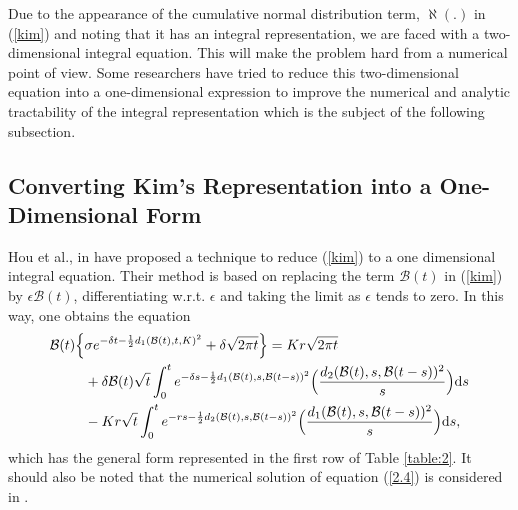 \documentclass[fleqn,final,3p,11pt]{elsarticle}
\theoremstyle{definition}
\theoremstyle{remark}
\numberwithin{equation}{section}
\begin{document}
Due to the appearance of the cumulative normal distribution term, $\aleph(.)$ in (\ref{kim}) and noting that it has an integral representation, we are faced with a two-dimensional integral equation. This will make the problem hard from a numerical point of view. Some researchers have tried to reduce this two-dimensional equation into a one-dimensional expression to improve the numerical and analytic tractability of the  integral representation which is the subject of the following subsection.
\subsection{Converting  Kim's Representation into a One-Dimensional Form}
Hou et al., in \cite{little} have proposed a technique to reduce (\ref{kim}) to a one dimensional integral equation. Their method is based on
 replacing the term $\mathcal{B}(t)$ in (\ref{kim}) by $\epsilon\mathcal{B}(t)$, differentiating w.r.t. $\epsilon$ and taking the limit as $\epsilon$ tends to zero. In this way, one obtains the equation
\begin{align}\label{2.4}
\mathcal{B}(t) \Big\{ &\sigma e^{- \delta t -\frac{1}{2}d_{1}(\mathcal{B}(t), t, K)^{2}}+ \delta \sqrt{2\pi t }\Big\}
 = K r \sqrt{2 \pi t}\notag \\
 &+ \delta \mathcal{B}(t)\sqrt{t}\int_{0}^{t}e^{-\delta s-\frac{1}{2}d_{1}(\mathcal{B}(t), s, \mathcal{B}(t-s))^{2}}\Big( \frac{d_{2}(\mathcal{B}(t), s, \mathcal{B}(t-s))^{2}}{s} \Big)\mathrm{d}s\notag\\
&-Kr\sqrt{t}\int_{0}^{t}e^{-r s-\frac{1}{2}d_{2}( \mathcal{B}(t), s, \mathcal{B}(t-s))^{2}}\Big( \frac{d_{1}( \mathcal{B}(t), s, \mathcal{B}(t-s))^{2}}{s} \Big)\mathrm{d}s,
\end{align}
which has the general form represented in the first row of Table \ref{table:2}. It should also be noted that the numerical solution of equation (\ref{2.4}) is considered in \cite{little}.
\end{document}
